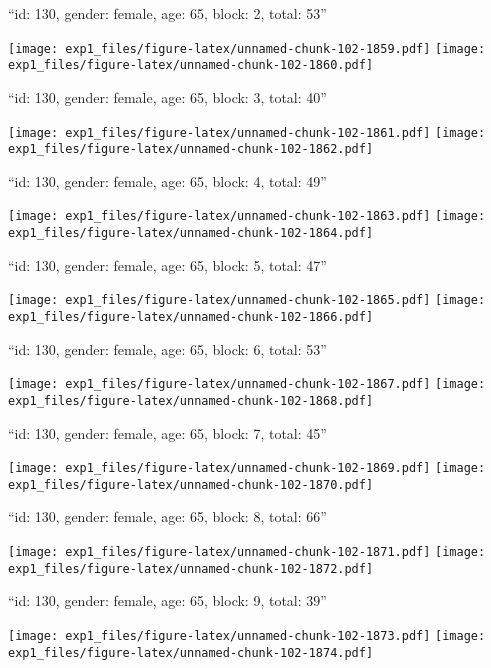 \documentclass[11pt,,]{article}
\begin{document}
\newpage
[1] 

``id: 130, gender: female, age: 65, block: 2, total: 53''

\texttt{[image: exp1\_files/figure-latex/unnamed-chunk-102-1859.pdf]}
\texttt{[image: exp1\_files/figure-latex/unnamed-chunk-102-1860.pdf]}

\newpage
[1] 

``id: 130, gender: female, age: 65, block: 3, total: 40''

\texttt{[image: exp1\_files/figure-latex/unnamed-chunk-102-1861.pdf]}
\texttt{[image: exp1\_files/figure-latex/unnamed-chunk-102-1862.pdf]}

\newpage
[1] 

``id: 130, gender: female, age: 65, block: 4, total: 49''

\texttt{[image: exp1\_files/figure-latex/unnamed-chunk-102-1863.pdf]}
\texttt{[image: exp1\_files/figure-latex/unnamed-chunk-102-1864.pdf]}

\newpage
[1] 

``id: 130, gender: female, age: 65, block: 5, total: 47''

\texttt{[image: exp1\_files/figure-latex/unnamed-chunk-102-1865.pdf]}
\texttt{[image: exp1\_files/figure-latex/unnamed-chunk-102-1866.pdf]}

\newpage
[1] 

``id: 130, gender: female, age: 65, block: 6, total: 53''

\texttt{[image: exp1\_files/figure-latex/unnamed-chunk-102-1867.pdf]}
\texttt{[image: exp1\_files/figure-latex/unnamed-chunk-102-1868.pdf]}

\newpage
[1] 

``id: 130, gender: female, age: 65, block: 7, total: 45''

\texttt{[image: exp1\_files/figure-latex/unnamed-chunk-102-1869.pdf]}
\texttt{[image: exp1\_files/figure-latex/unnamed-chunk-102-1870.pdf]}

\newpage
[1] 

``id: 130, gender: female, age: 65, block: 8, total: 66''

\texttt{[image: exp1\_files/figure-latex/unnamed-chunk-102-1871.pdf]}
\texttt{[image: exp1\_files/figure-latex/unnamed-chunk-102-1872.pdf]}

\newpage
[1] 

``id: 130, gender: female, age: 65, block: 9, total: 39''

\texttt{[image: exp1\_files/figure-latex/unnamed-chunk-102-1873.pdf]}
\texttt{[image: exp1\_files/figure-latex/unnamed-chunk-102-1874.pdf]}
\end{document}
